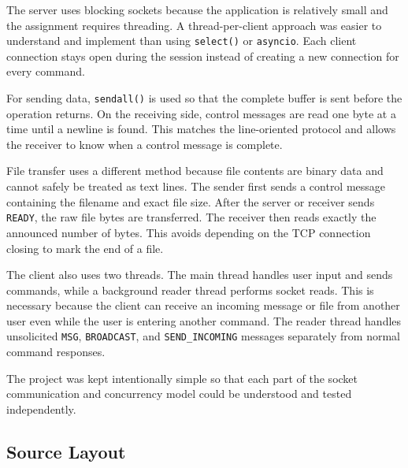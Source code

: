 \documentclass[11pt]{article}
\newcommand{\cmd}[1]{\texttt{#1}}
\begin{document}
The server uses blocking sockets because the application is relatively
small and the assignment requires threading. A thread-per-client
approach was easier to understand and implement than using
\cmd{select()} or \cmd{asyncio}. Each client connection stays open
during the session instead of creating a new connection for every
command.

For sending data, \cmd{sendall()} is used so that the complete buffer
is sent before the operation returns. On the receiving side, control
messages are read one byte at a time until a newline is found. This
matches the line-oriented protocol and allows the receiver to know when
a control message is complete.

File transfer uses a different method because file contents are binary
data and cannot safely be treated as text lines. The sender first sends
a control message containing the filename and exact file size. After
the server or receiver sends \cmd{READY}, the raw file bytes are
transferred. The receiver then reads exactly the announced number of
bytes. This avoids depending on the TCP connection closing to mark the
end of a file.

The client also uses two threads. The main thread handles user input
and sends commands, while a background reader thread performs socket
reads. This is necessary because the client can receive an incoming
message or file from another user even while the user is entering
another command. The reader thread handles unsolicited \cmd{MSG},
\cmd{BROADCAST}, and \cmd{SEND\_INCOMING} messages separately from
normal command responses.

The project was kept intentionally simple so that each part of the
socket communication and concurrency model could be understood and
tested independently.

\subsection{Source Layout}
\end{document}
